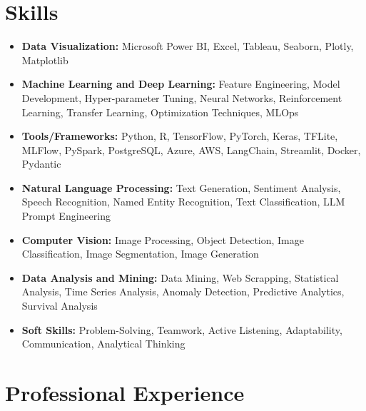 \documentclass[11pt,a4paper,sans]{moderncv}
\begin{document}
\section{Skills}
{\begin{itemize}[label=\textbullet]
\item {\textbf{Data Visualization:} Microsoft Power BI, Excel, Tableau, Seaborn, Plotly, Matplotlib}
\item {\textbf{Machine Learning and Deep Learning:} Feature Engineering, Model Development, 
Hyper-parameter Tuning, 
Neural Networks,
Reinforcement Learning,
Transfer Learning,
Optimization Techniques,
MLOps}
\item {\textbf{Tools/Frameworks:} 
Python,
R,
TensorFlow,
PyTorch,
Keras,
TFLite,
MLFlow,
PySpark,
PostgreSQL,
Azure,
AWS,
LangChain,
Streamlit,
Docker,
Pydantic

}
\item {\textbf{Natural Language Processing:} Text Generation,
Sentiment Analysis,
Speech Recognition,
Named Entity Recognition,
Text Classification, LLM Prompt Engineering}
\item {\textbf{Computer Vision:} Image Processing, Object Detection, Image Classification, Image Segmentation, Image Generation}
\item {\textbf{Data Analysis and Mining:} Data Mining,
Web Scrapping,
Statistical Analysis,
Time Series Analysis,
Anomaly Detection,
Predictive Analytics,
Survival Analysis}
\item {\textbf{Soft Skills:} Problem-Solving, Teamwork, Active Listening, Adaptability, Communication, Analytical Thinking}
\end{itemize}}



\section{Professional Experience}
\end{document}
